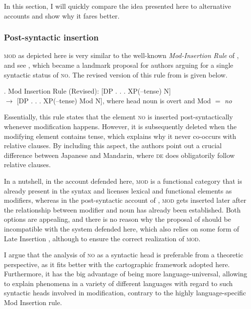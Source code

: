 \documentclass [output=book,colorlinks,citecolor=brown]{langscibook}
\begin{document}
In this section, I will quickly compare the idea presented here to alternative accounts and show why it fares better.

\subsubsection{Post-syntactic insertion}

\textsc{mod} as depicted here is very similar to the well-known \textit{Mod-Insertion Rule} of \citet{kitagawa:1982:prenominal}, and see \citet{watanabe:2010:notes}, which became a landmark proposal for authors arguing for a single syntactic status of \textsc{no}. The revised version of this rule from \citet{watanabe:2010:notes} is given below.

\ex. Mod Insertion Rule (Revised): [DP . . . XP(–tense) N] \\ $\rightarrow$ [DP . . . XP(–tense) Mod N], where head noun is overt and Mod $=$ \textit{no} \\ \null \hfill \citep[66]{watanabe:2010:notes}

Essentially, this rule states that the element \textsc{no} is inserted post-syntactically whenever modification happens. However, it is subsequently deleted when the modifying element contains tense, which explains why it never co-occurs with relative clauses. By including this aspect, the authors point out a crucial difference between Japanese and Mandarin, where \textsc{de} does obligatorily follow relative clauses.

In a nutshell, in the account defended here, \textsc{mod} is a functional category that is already present in the syntax and licenses lexical and functional elements as modifiers, whereas in the post-syntactic account of \citet{kitagawa:1982:prenominal}, \textsc{mod} gets inserted later after the relationship between modifier and noun has already been established. Both options are appealing, and there is no reason why the proposal of \citet{kitagawa:1982:prenominal} should be incompatible with the system defended here, which also relies on some form of Late Insertion \citep{halle:1993:distributed, chomsky:2001:derivation}, although to ensure the correct realization of \textsc{mod}.

I argue that the analysis of \textsc{no} as a syntactic head is preferable from a theoretic perspective, as it fits better with the cartographic framework adopted here. Furthermore, it has the big advantage of being more language-universal, allowing to explain phenomena in a variety of different languages with regard to such syntactic heads involved in modification, contrary to the highly language-specific Mod Insertion rule.
\end{document}
